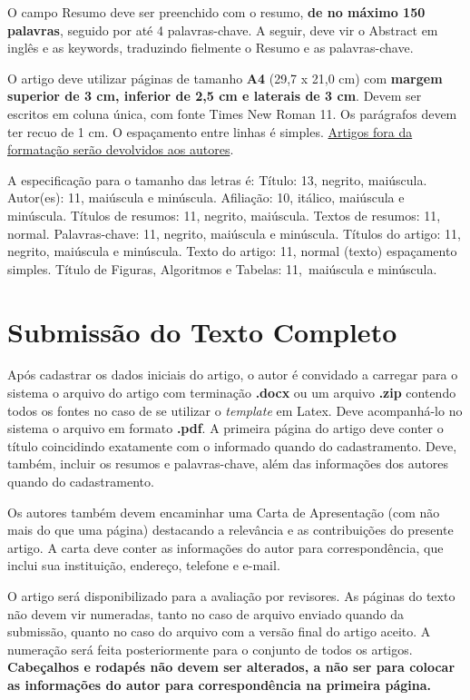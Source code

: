 \documentclass[a4paper,11pt,fleqn]{article}
\begin{document}
O campo Resumo deve ser preenchido com o resumo, \textbf{de no máximo 150 palavras}, seguido por até 4 palavras-chave. A seguir, deve vir o Abstract em inglês e as keywords, traduzindo fielmente o Resumo e as palavras-chave. 

O artigo deve utilizar páginas de tamanho \textbf{A4} (29,7 x 21,0 cm) com \textbf{margem superior de 3 cm, inferior de 2,5 cm e laterais de 3 cm}. Devem ser escritos em coluna única, com fonte Times New Roman 11. Os parágrafos devem ter recuo de 1 cm. O espaçamento entre linhas é simples. \underline{Artigos fora da formatação serão devolvidos aos autores}.

A especificação para o tamanho das letras é: Título: 13, negrito, maiúscula. Autor(es): 11, maiúscula e minúscula. Afiliação: 10, itálico, maiúscula e minúscula. Títulos de resumos: 11, negrito, maiúscula. Textos de resumos: 11, normal. Palavras-chave: 11, negrito, maiúscula e minúscula. Títulos do artigo: 11, negrito, maiúscula e minúscula. Texto do artigo: 11, normal (texto) espaçamento simples. Título de Figuras, Algoritmos e Tabelas: 11, maiúscula e minúscula.
    
\section{Submissão do Texto Completo}

Após cadastrar os dados iniciais do artigo, o autor é convidado a carregar para o sistema o arquivo do artigo com terminação \textbf{.docx} ou um arquivo \textbf{.zip} contendo todos os fontes no caso de se utilizar o \textit{template} em Latex. Deve acompanhá-lo no sistema o arquivo em formato \textbf{.pdf}. A primeira página do artigo deve conter o título coincidindo exatamente com o informado quando do cadastramento. Deve, também, incluir os resumos e palavras-chave, além das informações dos autores quando do cadastramento.


Os autores também devem encaminhar uma Carta de Apresentação (com não mais do que uma página) destacando a relevância e as contribuições do presente artigo. A carta deve conter as informações do autor para correspondência, que inclui sua instituição, endereço, telefone e e-mail. 

O artigo será disponibilizado para a avaliação por revisores. As páginas do texto não devem vir numeradas, tanto no caso de arquivo enviado quando da submissão, quanto no caso do arquivo com a versão final do artigo aceito. A numeração será feita posteriormente para o conjunto de todos os artigos. \textbf{Cabeçalhos e rodapés não devem ser alterados, a não ser para colocar as informações do autor para correspondência na primeira página.}
\end{document}
